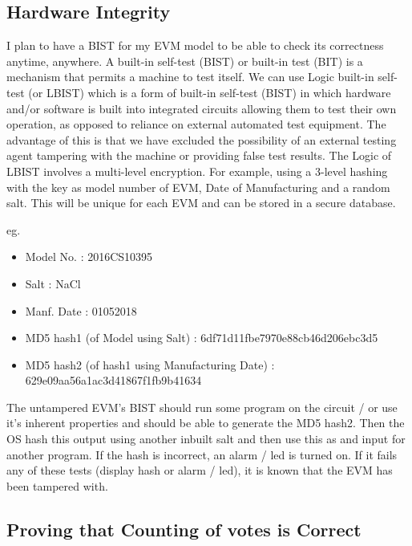 \documentclass[11pt]{article}
\begin{document}
    \subsection{Hardware Integrity}
    I plan to have a BIST for my EVM model to be able to check its correctness anytime, anywhere. A built-in self-test (BIST) or built-in test (BIT) is a mechanism that permits a machine to test itself. We can use Logic built-in self-test (or LBIST) which is a form of built-in self-test (BIST) in which hardware and/or software is built into integrated circuits allowing them to test their own operation, as opposed to reliance on external automated test equipment. The advantage of this is that we have excluded the possibility of an external testing agent tampering with the machine or providing false test results.
    The Logic of LBIST involves a multi-level encryption. For example, using a 3-level hashing with the key as model number of EVM, Date of Manufacturing and a random salt. This will be unique for each EVM and can be stored in a secure database.
    
    \newline
    
    eg.
    
    \newline
    
    \begin{itemize}
        \item Model No. : 2016CS10395
        \item Salt : NaCl
        \item Manf. Date : 01052018
        \item MD5 hash1 (of Model using Salt) : 6df71d11fbe7970e88cb46d206ebc3d5
        \item MD5 hash2 (of hash1 using Manufacturing Date) : 629e09aa56a1ac3d41867f1fb9b41634
    \end{itemize}
    
    The untampered EVM's BIST should run some program on the circuit / or use it's inherent properties and should be able to generate the MD5 hash2. Then the OS hash this output using another inbuilt salt and then use this as and input for another program. If the hash is incorrect, an alarm / led is turned on. If it fails any of these tests (display hash or alarm / led), it is known that the EVM has been tampered with.
    
    
    \subsection{Proving that Counting of votes is Correct}
    
\end{document}
